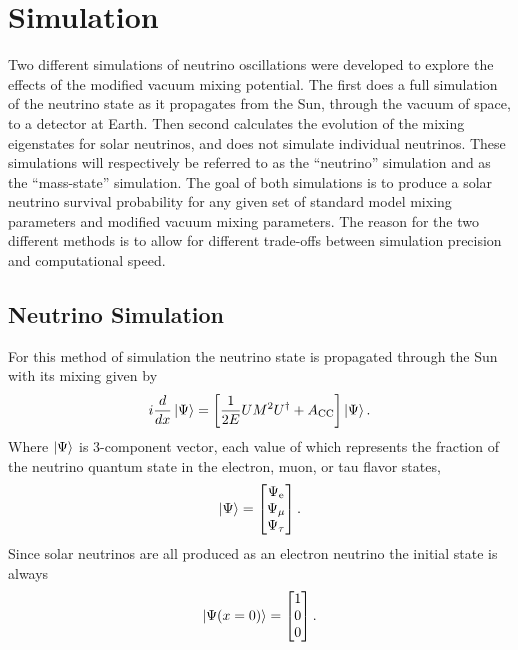 \section{Simulation}
Two different simulations of neutrino oscillations were developed to explore the
effects of the modified vacuum mixing potential.
The first
does a full simulation of the neutrino state as it propagates from the
Sun, through the vacuum of space, to a detector at Earth.
Then second calculates the evolution
of the mixing eigenstates for solar neutrinos, and does not simulate individual
neutrinos.
These simulations will respectively be referred to as the ``neutrino'' simulation
and as the ``mass-state'' simulation.
The goal of both simulations is to produce a solar neutrino survival probability
for any given set of standard model mixing parameters and modified vacuum
mixing parameters.
The reason for the two different methods is to allow for different
trade-offs between simulation precision and computational speed.

\subsection{Neutrino Simulation}
For this method of simulation the neutrino state is propagated through the
Sun with its mixing given by
\begin{equation}
    i\frac{d}{dx}\ket{\Psi} = \left[\frac{1}{2E}UM^{2}U^{\dagger} + A_{\mathrm{CC}}\right]\ket{\Psi}\text{.}
    \label{eqn:mixing_schrodinger}
\end{equation}
Where $\ket{\Psi}$ is 3-component vector, each value of which represents
the fraction of the neutrino quantum state in the electron, muon, or tau flavor states,
\begin{equation}
\ket{\Psi} = 
\begin{bmatrix}
    \Psi_{\mathrm{e}}\\
    \Psi_{\mathrm{\mu}}\\
    \Psi_{\mathrm{\tau}}\\
\end{bmatrix}\mathrm{.}
\end{equation}
Since solar neutrinos are all produced as an electron neutrino the
initial state is always
\begin{equation}
\ket{\Psi(x=0)} = 
\begin{bmatrix}
1\\
0\\
0\\
\end{bmatrix}\mathrm{.}
\end{equation}


